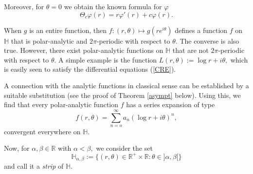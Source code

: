 \documentclass[amsmath,english,a4paper,graphicx,12pt]{article}
\begin{document}
Moreover, for $\theta = 0$ we obtain the known formula for $\varphi$ $$\Theta_c\varphi(r) = r\varphi'(r) + c\varphi (r).$$

When $g$ is an entire function, then $f: (r, \theta) \mapsto g(re^{i\theta})$ defines a function $f$ on $\mathbb{H}$ that is polar-analytic 
and $2\pi$-periodic with respect to $\theta.$ The converse is also true. However, there exist polar-analytic functions on $\mathbb{H}$ 
that are not $2\pi$-periodic with respect to $\theta.$ A simple example is the function $L(r, \theta):= \log r + i\theta,$ which is easily seen 
to satisfy the differential equations (\ref{CRE}).

 A connection with the analytic functions in classical sense can be established by a suitable substitution (see the proof of Theorem \ref{asympt} below). Using this, we find that every polar-analytic function $f$ has a series expansion of type
$$f(r,\theta) = \sum_{n=o}^\infty a_n (\log r + i\theta)^n,$$
convergent everywhere on $\mathbb{H}.$ 

Now, for $\alpha, \beta \in \mathbb{R}$ with $\alpha < \beta,$ we consider the set
$$\mathbb{H}_{\alpha, \beta}:= \{(r, \theta) \in \mathbb{R}^+ \times \mathbb{R}: \theta \in ]\alpha, \beta[\}$$
and call it a {\it strip} of $\mathbb{H}.$
\end{document}
